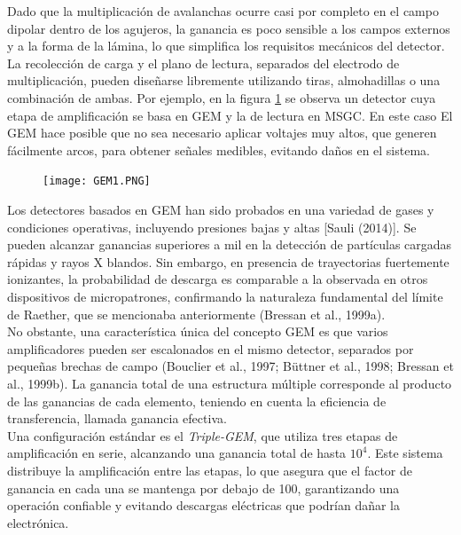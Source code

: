 \documentclass[]{book}
\begin{document}
\noindent Dado que la multiplicación de avalanchas ocurre casi por completo en el campo dipolar dentro de los agujeros, la ganancia es poco sensible a los campos externos y a la forma de la lámina, lo que simplifica los requisitos mecánicos del detector. La recolección de carga y el plano de lectura, separados del electrodo de multiplicación, pueden diseñarse libremente utilizando tiras, almohadillas o una combinación de ambas. Por ejemplo, en la figura \ref{fig:gem_MSGC} se observa un detector cuya etapa de amplificación se basa en GEM y la de lectura en MSGC. En este caso El GEM hace posible que no sea necesario aplicar voltajes muy altos, que generen fácilmente arcos, para obtener señales medibles, evitando daños en el sistema. 

\begin{figure}[H]
    \centering
    \texttt{[image: GEM1.PNG]}
    \caption{}
    \label{fig:gem_MSGC}
\end{figure}


\noindent Los detectores basados en GEM han sido probados en una variedad de gases y condiciones operativas, incluyendo presiones bajas y altas [Sauli (2014)]. Se pueden alcanzar ganancias superiores a mil en la detección de partículas cargadas rápidas y rayos X blandos. Sin embargo, en presencia de trayectorias fuertemente ionizantes, la probabilidad de descarga es comparable a la observada en otros dispositivos de micropatrones, confirmando la naturaleza fundamental del límite de Raether, que se mencionaba anteriormente (Bressan et al., 1999a).\\

\noindent No obstante, una característica única del concepto GEM es que varios amplificadores pueden ser escalonados en el mismo detector, separados por pequeñas brechas de campo (Bouclier et al., 1997; Büttner et al., 1998; Bressan et al., 1999b). La ganancia total de una estructura múltiple corresponde al producto de las ganancias de cada elemento, teniendo en cuenta la eficiencia de transferencia, llamada ganancia efectiva.\\

\noindent Una configuración estándar es el \textit{Triple-GEM}, que utiliza tres etapas de amplificación en serie, alcanzando una ganancia total de hasta $10^4$. Este sistema distribuye la amplificación entre las etapas, lo que asegura que el factor de ganancia en cada una se mantenga por debajo de 100, garantizando una operación confiable y evitando descargas eléctricas que podrían dañar la electrónica.\\
\end{document}
